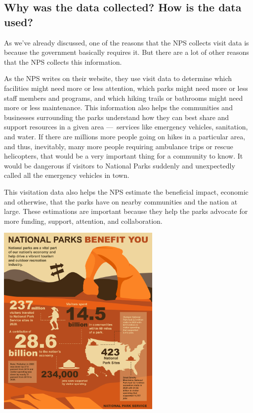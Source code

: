 \documentclass[
  letterpaper,
  DIV=11,
  numbers=noendperiod]{scrartcl}
\begin{document}
\subsection{Why was the data collected? How is the data
used?}\label{why-was-the-data-collected-how-is-the-data-used}

As we've already discussed, one of the reasons that the NPS collects
visit data is because the government basically requires it. But there
are a lot of other reasons that the NPS collects this information.

As the NPS writes on their website, they use visit data to determine
which facilities might need more or less attention, which parks might
need more or less staff members and programs, and which hiking trails or
bathrooms might need more or less maintenance. This information also
helps the communities and businesses surrounding the parks understand
how they can best share and support resources in a given area
---~services like emergency vehicles, sanitation, and water. If there
are millions more people going on hikes in a particular area, and thus,
inevitably, many more people requiring ambulance trips or rescue
helicopters, that would be a very important thing for a community to
know. It would be dangerous if visitors to National Parks suddenly and
unexpectedly called all the emergency vehicles in town.

This visitation data also helps the NPS estimate the beneficial impact,
economic and otherwise, that the parks have on nearby communities and
the nation at large. These estimations are important because they help
the parks advocate for more funding, support, attention, and
collaboration.

\includegraphics[width=3.125in,height=\textheight]{NP-economic-benefit-poster.jpg}
\end{document}
